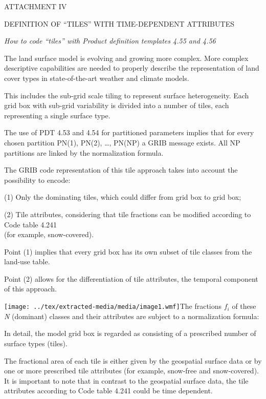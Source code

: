 ATTACHMENT IV

DEFINITION OF ``TILES'' WITH TIME-DEPENDENT ATTRIBUTES

\emph{How to code ``tiles'' with Product definition templates 4.55 and 4.56}

The land surface model is evolving and growing more complex. More complex descriptive capabilities are needed to properly describe the representation of land cover types in state-of-the-art weather and climate models.

This includes the sub-grid scale tiling to represent surface heterogeneity. Each grid box with sub-grid variability is divided into a number of tiles, each representing a single surface type.

The use of PDT 4.53 and 4.54 for partitioned parameters implies that for every chosen partition PN(1), PN(2), \ldots, PN(NP) a GRIB message exists. All NP partitions are linked by the normalization formula.

The GRIB code representation of this tile approach takes into account the possibility to encode:

(1) Only the {dominating} tiles, which could differ from grid box to grid box;

(2) Tile attributes, considering that tile fractions can be modified according to Code table 4.241\\
(for example, snow-covered).

Point (1) implies that every grid box has its own subset of tile classes from the land-use table.

Point (2) allows for the differentiation of tile attributes, the {temporal component} of this approach.

\texttt{[image: ../tex/extracted-media/media/image1.wmf]}The fractions \(f_{i}\) of these \emph{N} (dominant) classes and their attributes are subject to a normalization formula:

In detail, the model grid box is regarded as consisting of a prescribed number of surface types (tiles).

The fractional area of each tile is either given by the geospatial surface data or by one or more prescribed tile attributes (for example, snow-free and snow-covered). It is important to note that in contrast to the geospatial surface data, the tile attributes according to Code table 4.241 could be time dependent.

